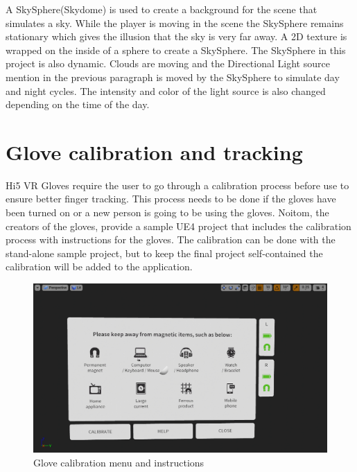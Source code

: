 \documentclass[12pt, a4paper,oneside, nocenter]{thesis}
\begin{document}
\par
A SkySphere(Skydome) is used to create a background for the scene that simulates a sky. While the player is moving in the scene the SkySphere remains stationary which gives the illusion that the sky is very far away. A 2D texture is wrapped on the inside of a sphere to create a SkySphere. The SkySphere in this project is also dynamic. Clouds are moving and the Directional Light source mention in the previous paragraph is moved by the SkySphere to simulate day and night cycles. The intensity and color of the light source is also changed depending on the time of the day.
\section{Glove calibration and tracking}
Hi5 VR Gloves require the user to go through a calibration process before use to ensure better finger tracking. This process needs to be done if the gloves have been turned on or a new person is going to be using the gloves. Noitom, the creators of the gloves, provide a sample UE4 project that includes the calibration process with instructions for the gloves. The calibration can be done with the stand-alone sample project, but to keep the final project self-contained the calibration will be added to the application.
\begin{figure}[H]
	\includegraphics[width=\textwidth]{calibration-menu}
	\caption{Glove calibration menu and instructions}
	\label{fig:calibration-menu}
\end{figure}
\par
\end{document}

